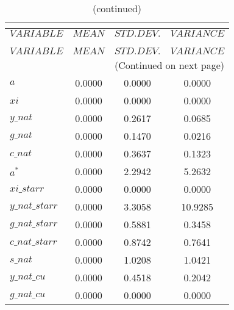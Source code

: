  
\begin{center}
\begin{longtable}{lccc} 
\caption{THEORETICAL MOMENTS}\\
 \label{Table:th_moments}\\
\toprule 
$VARIABLE       $	 & 	 $         MEAN$	 & 	 $    STD. DEV.$	 & 	 $     VARIANCE$\\
\midrule \endfirsthead 
\caption{(continued)}\\
 \toprule \\ 
$VARIABLE       $	 & 	 $         MEAN$	 & 	 $    STD. DEV.$	 & 	 $     VARIANCE$\\
\midrule \endhead 
\midrule \multicolumn{4}{r}{(Continued on next page)} \\ \bottomrule \endfoot 
\bottomrule \endlastfoot 
${a}            $	 & 	       0.0000	 & 	       0.0000	 & 	       0.0000 \\ 
$xi             $	 & 	       0.0000	 & 	       0.0000	 & 	       0.0000 \\ 
$y\_nat         $	 & 	       0.0000	 & 	       0.2617	 & 	       0.0685 \\ 
$g\_nat         $	 & 	       0.0000	 & 	       0.1470	 & 	       0.0216 \\ 
$c\_nat         $	 & 	       0.0000	 & 	       0.3637	 & 	       0.1323 \\ 
${a^*}          $	 & 	       0.0000	 & 	       2.2942	 & 	       5.2632 \\ 
$xi\_starr      $	 & 	       0.0000	 & 	       0.0000	 & 	       0.0000 \\ 
$y\_nat\_starr  $	 & 	       0.0000	 & 	       3.3058	 & 	      10.9285 \\ 
$g\_nat\_starr  $	 & 	       0.0000	 & 	       0.5881	 & 	       0.3458 \\ 
$c\_nat\_starr  $	 & 	       0.0000	 & 	       0.8742	 & 	       0.7641 \\ 
$s\_nat         $	 & 	       0.0000	 & 	       1.0208	 & 	       1.0421 \\ 
$y\_nat\_cu     $	 & 	       0.0000	 & 	       0.4518	 & 	       0.2042 \\ 
$g\_nat\_cu     $	 & 	       0.0000	 & 	       0.0000	 & 	       0.0000 \\ 
\end{longtable}
 \end{center}

